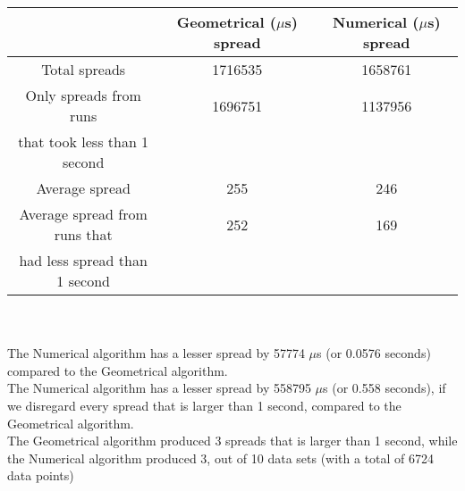 \begin{tabular}[3]{c|c|c}
 & Geometrical ($\mu$s) spread & Numerical ($\mu$s) spread\\
\hline
Total spreads & 1716535 & 1658761 \\ 
\hline 
Only spreads from runs & 1696751 & 1137956 \\ 
that took less than 1 second & & \\ 
\hline
Average spread & 255 & 246 \\
\hline
Average spread from runs that & 252 & 169 \\ 
had less spread than 1 second & & \\ 
\end{tabular}\\ \\
The Numerical algorithm has a lesser spread by 57774 $\mu$s (or 0.0576 seconds) compared to the Geometrical algorithm.\\
The Numerical algorithm has a lesser spread by 558795 $\mu$s (or 0.558 seconds), if we disregard every spread that is larger than 1 second, compared to the Geometrical algorithm.\\
The Geometrical algorithm produced 3 spreads that is larger than 1 second, while the Numerical algorithm produced 3, out of 10 data sets (with a total of 6724 data points)\\
